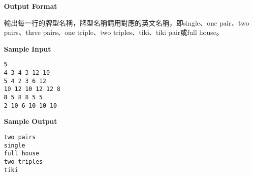 \textbf{\large Output Format}

輸出每一行的牌型名稱，牌型名稱請用對應的英文名稱，即single、one
pair、two pairs、three pairs、one triple、two triples、tiki、tiki pair或full house。

\textbf{\large Sample Input}

\begin{verbatim}
5
4 3 4 3 12 10
5 4 2 3 6 12
10 12 10 12 12 8
8 5 8 8 5 5
2 10 6 10 10 10
\end{verbatim}

\textbf{\large Sample Output}
\begin{verbatim}
two pairs
single
full house
two triples
tiki
\end{verbatim}
